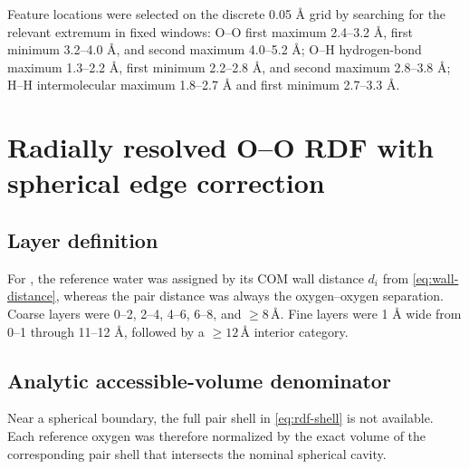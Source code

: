\documentclass[11pt]{article}
\newcommand{\angstrom}{\text{\AA}}
\begin{document}
Feature locations were selected on the discrete 0.05 \(\angstrom\) grid by
searching for the relevant extremum in fixed windows: O--O first maximum
2.4--3.2 \(\angstrom\), first minimum 3.2--4.0 \(\angstrom\), and second
maximum 4.0--5.2 \(\angstrom\); O--H hydrogen-bond maximum
1.3--2.2 \(\angstrom\), first minimum 2.2--2.8 \(\angstrom\), and second
maximum 2.8--3.8 \(\angstrom\); H--H intermolecular maximum
1.8--2.7 \(\angstrom\) and first minimum 2.7--3.3 \(\angstrom\).

\section{Radially resolved O--O RDF with spherical edge correction}

\subsection{Layer definition}

For , the reference water was assigned by its COM
wall distance \(d_i\) from \cref{eq:wall-distance}, whereas the pair distance
was always the oxygen--oxygen separation.  Coarse layers were 0--2, 2--4,
4--6, 6--8, and \(\geq8\,\angstrom\).  Fine layers were 1 \(\angstrom\)
wide from 0--1 through 11--12 \(\angstrom\), followed by a
\(\geq12\,\angstrom\) interior category.

\subsection{Analytic accessible-volume denominator}

Near a spherical boundary, the full pair shell in \cref{eq:rdf-shell} is not
available.  Each reference oxygen was therefore normalized by the exact
volume of the corresponding pair shell that intersects the nominal spherical
cavity.
\end{document}
